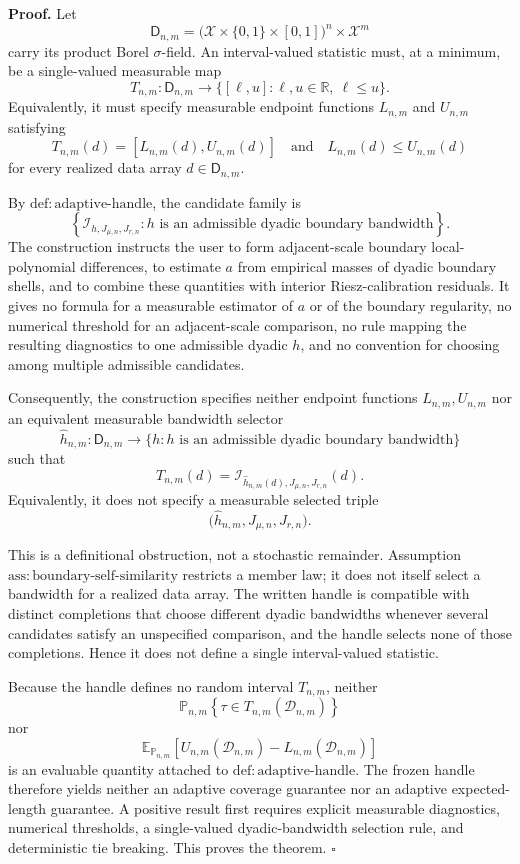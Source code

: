 \textbf{Proof.}
Let
\[
\mathsf D_{n,m}
=\bigl(\mathcal X\times\{0,1\}\times[0,1]\bigr)^n\times\mathcal X^m
\]
carry its product Borel \(\sigma\)-field. An interval-valued statistic must, at a minimum, be a single-valued measurable map
\[
T_{n,m}:\mathsf D_{n,m}\longrightarrow
\bigl\{[\ell,u]:\ell,u\in\mathbb R,\ \ell\le u\bigr\}.
\]
Equivalently, it must specify measurable endpoint functions \(L_{n,m}\) and \(U_{n,m}\) satisfying
\[
T_{n,m}(d)=[L_{n,m}(d),U_{n,m}(d)]
\quad\text{and}\quad
L_{n,m}(d)\le U_{n,m}(d)
\]
for every realized data array \(d\in\mathsf D_{n,m}\).

By \(\mathrm{def:adaptive\text{-}handle}\), the candidate family is
\[
\left\{\mathcal I_{h,J_{\mu,n},J_{r,n}}:
h\text{ is an admissible dyadic boundary bandwidth}\right\}.
\]
The construction instructs the user to form adjacent-scale boundary local-polynomial differences, to estimate \(a\) from empirical masses of dyadic boundary shells, and to combine these quantities with interior Riesz-calibration residuals. It gives no formula for a measurable estimator of \(a\) or of the boundary regularity, no numerical threshold for an adjacent-scale comparison, no rule mapping the resulting diagnostics to one admissible dyadic \(h\), and no convention for choosing among multiple admissible candidates.

Consequently, the construction specifies neither endpoint functions \(L_{n,m},U_{n,m}\) nor an equivalent measurable bandwidth selector
\[
\widehat h_{n,m}:\mathsf D_{n,m}\longrightarrow
\{h:h\text{ is an admissible dyadic boundary bandwidth}\}
\]
such that
\[
T_{n,m}(d)
=\mathcal I_{\widehat h_{n,m}(d),J_{\mu,n},J_{r,n}}(d).
\]
Equivalently, it does not specify a measurable selected triple
\[
\bigl(\widehat h_{n,m},J_{\mu,n},J_{r,n}\bigr).
\]

This is a definitional obstruction, not a stochastic remainder. Assumption \(\mathrm{ass:boundary\text{-}self\text{-}similarity}\) restricts a member law; it does not itself select a bandwidth for a realized data array. The written handle is compatible with distinct completions that choose different dyadic bandwidths whenever several candidates satisfy an unspecified comparison, and the handle selects none of those completions. Hence it does not define a single interval-valued statistic.

Because the handle defines no random interval \(T_{n,m}\), neither
\[
\mathbb P_{n,m}\!\left\{\tau\in T_{n,m}(\mathcal D_{n,m})\right\}
\]
nor
\[
\mathbb E_{\mathbb P_{n,m}}\!\left[
U_{n,m}(\mathcal D_{n,m})-L_{n,m}(\mathcal D_{n,m})
\right]
\]
is an evaluable quantity attached to \(\mathrm{def:adaptive\text{-}handle}\). The frozen handle therefore yields neither an adaptive coverage guarantee nor an adaptive expected-length guarantee. A positive result first requires explicit measurable diagnostics, numerical thresholds, a single-valued dyadic-bandwidth selection rule, and deterministic tie breaking. This proves the theorem. \(\square\)